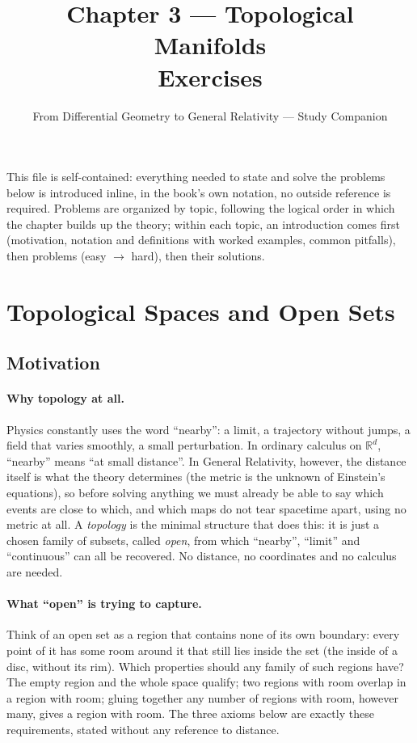 \documentclass[11pt]{article}
\title{Chapter 3 --- Topological Manifolds\\ \large Exercises}
\author{From Differential Geometry to General Relativity --- Study Companion}
\date{}
\begin{document}
\maketitle

\noindent This file is self-contained: everything needed to state and solve
the problems below is introduced inline, in the book's own notation, no
outside reference is required. Problems are organized by topic, following
the logical order in which the chapter builds up the theory; within each
topic, an introduction comes first (motivation, notation and definitions with
worked examples, common pitfalls), then problems (easy $\to$ hard), then
their solutions.

\section{Topological Spaces and Open Sets}

\subsection*{Motivation}

\paragraph{Why topology at all.}
Physics constantly uses the word ``nearby'': a limit, a trajectory without jumps, a field that varies smoothly, a small perturbation. In ordinary calculus on $\mathbb R^d$, ``nearby'' means ``at small distance''. In General Relativity, however, the distance itself is what the theory determines (the metric is the unknown of Einstein's equations), so before solving anything we must already be able to say which events are close to which, and which maps do not tear spacetime apart, using no metric at all. A \emph{topology} is the minimal structure that does this: it is just a chosen family of subsets, called \emph{open}, from which ``nearby'', ``limit'' and ``continuous'' can all be recovered. No distance, no coordinates and no calculus are needed.

\paragraph{What ``open'' is trying to capture.}
Think of an open set as a region that contains none of its own boundary: every point of it has some room around it that still lies inside the set (the inside of a disc, without its rim). Which properties should any family of such regions have? The empty region and the whole space qualify; two regions with room overlap in a region with room; gluing together any number of regions with room, however many, gives a region with room. The three axioms below are exactly these requirements, stated without any reference to distance.
\end{document}
